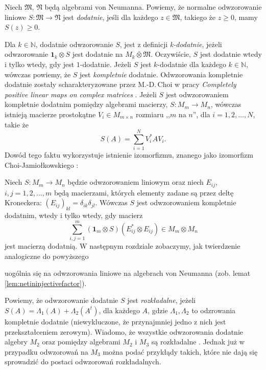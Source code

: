 \begin{Definition}
Niech $\mathfrak{M}$, $\mathfrak{N}$ będą algebrami von Neumanna.
Powiemy, że normalne odwzorowanie liniowe
$S: \mathfrak{M} \rightarrow \mathfrak{N}$
jest \emph{dodatnie},
jeśli dla każdego $z \in \mathfrak{M}$,
takiego że $z \geq 0$, mamy
$S(z) \geq 0$.
\end{Definition}

Dla $k \in \mathbb{N}$, dodatnie odwzorowanie $S$,
jest z definicji \emph{k-dodatnie}, jeżeli
odwzorowanie
$\mathbf{1}_{k} \otimes S$
jest dodatnie na $M_{k} \bar{\otimes} \mathfrak{M}$.
Oczywiście, $S$ jest dodatnie wtedy i tylko wtedy, gdy jest $1$-dodatnie.
Jeżeli $S$ jest $k$-dodatnie dla każdego $k \in \mathbb{N}$,
wówczas powiemy, że $S$ jest \emph{kompletnie} dodatnie.
Odwzorowania kompletnie dodatnie zostały scharakteryzowane przez M.-D.\,Choi
w pracy \emph{Completely positive linear maps on complex matrices}
\cite{choi1975completely}.
Jeżeli $S$ jest odwzorowaniem kompletnie dodatnim pomiędzy algebrami macierzy,
$S: M_{m} \rightarrow M_{n}$, wówczas istnieją macierze prostokątne
$V_{i} \in M_{m \times n}$ rozmiaru ,,$m$ na $n$'', dla $i = 1,2,\ldots,N$,
takie że
\begin{equation}
    S(A) = \sum \limits_{i = 1}^{N} V_{i}^{*} A V_{i}.
\end{equation}
Dowód tego faktu wykorzystuje istnienie izomorfizmu,
znanego jako izomorfizm Choi-Jamiołkowskiego
\cite{choi1975completely, jamiolkowski1974effective}:
\begin{Theorem}
    Niech $S: M_{m} \rightarrow M_{n}$ będzie odwzorowaniem liniowym
    oraz niech $E_{ij}$, $i,j = 1,2,\ldots,m$ będą macierzami, których
    elementy zadane są przez deltę Kroneckera:
    $(E_{ij})_{kl} = \delta_{ik} \delta_{jl}$.
    Wówczas $S$ jest odwzorowaniem kompletnie dodatnim,
    wtedy i tylko wtedy, gdy macierz
    \begin{equation}
        \sum \limits_{i,j=1}^{m} (\mathbf{1}_{m} \otimes S)
            (E_{ij}^{*} \otimes E_{ij}) \in M_{m} \otimes M_{n}
    \end{equation}
    jest macierzą dodatnią.
W następnym rozdziale zobaczymy, jak twierdzenie analogiczne do powyższego
\end{Theorem}
uogólnia się na odwzorowania liniowe na algebrach von Neumanna
(zob. lemat \ref{lem:netininjectivefactor}).

Powiemy, że odwzorowanie dodatnie $S$ jest \emph{rozkładalne}, jeżeli
 $S(A) = \Lambda_{1}(A) + \Lambda_{2} (A^{t})$,
 dla każdego $A$,
gdzie $\Lambda_{1}, \Lambda_{2}$ to odzrowania kompletnie dodatnie
(niewykluczone, że przynajmniej jedno z nich jest przekształceniem zerowym).
Wiadomo, że wszystkie odwzorowania dodatnie algebry $M_{2}$
oraz pomiędzy algebrami $M_{2}$ i $M_{3}$ są rozkładalne
\cite{Stormer2013}.
Jednak już w przypadku odwzorowań na $M_{3}$ można podać przykłądy takich,
które nie dają się sprowadzić do postaci odwzorowań rozkładalnych.

